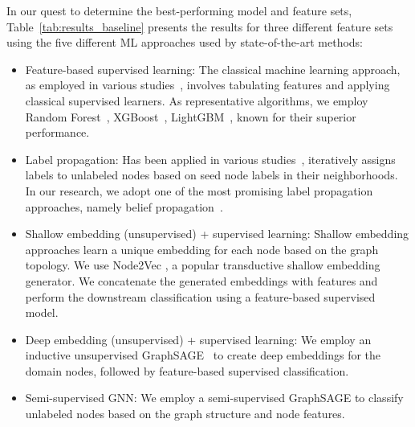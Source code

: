 In our quest to determine the best-performing model and feature sets, Table~\ref{tab:results_baseline} presents the results for three different feature sets using the five different ML approaches used by state-of-the-art methods:

\begin{itemize}[leftmargin=*]
\itemsep0em
    \item Feature-based supervised learning: The classical machine learning approach, as employed in various studies~\cite{Notos_Antonakakis2010, bilge:2014:Exposure,  lexical2015, page:2019:mal, practicalattacks:SP:2024}, involves tabulating features and applying classical supervised learners. As representative algorithms, we employ Random Forest~\cite{Leistner:2009:SSLRandomForest}, XGBoost~\cite{chen2016xgboost}, LightGBM~\cite{ke2017lightgbm}, known for their superior performance.
    \item Label propagation: Has been applied in various studies~\cite{polonium:SIAM:2011, nazca:NDSS:2014, BPPhishingCCS:2022, bp_mal2:2020, marmite:CCS:2017}, iteratively assigns labels to unlabeled nodes based on seed node labels in their neighborhoods. In our research, we adopt one of the most promising label propagation approaches, namely belief propagation~\cite{Yedidia:2003:BP}. 
    \item Shallow embedding (unsupervised) + supervised learning: Shallow embedding approaches learn a unique embedding for each node based on the graph topology. We use Node2Vec \cite{node2vec:sigkdd:2016}, a popular transductive shallow embedding generator. We concatenate the generated embeddings with features and perform the downstream classification using a feature-based supervised model. 
    \item Deep embedding (unsupervised) + supervised learning: We employ an inductive unsupervised GraphSAGE~\cite{graphsage:nips:2017} to create deep embeddings for the domain nodes, followed by feature-based supervised classification.
    \item Semi-supervised GNN: We employ a semi-supervised GraphSAGE to classify unlabeled nodes based on the graph structure and node features.
\end{itemize}


